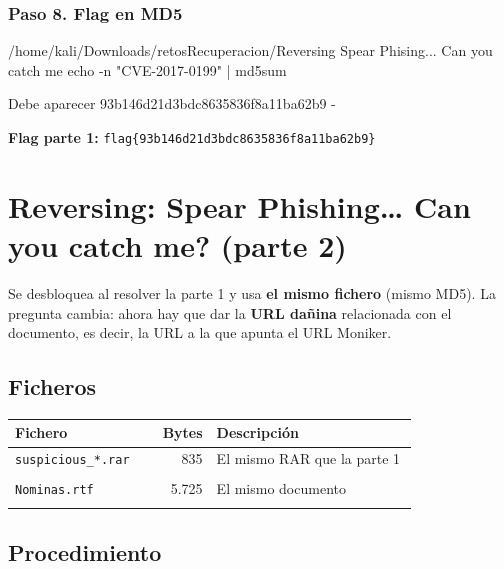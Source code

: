\documentclass[11pt,a4paper]{article}
\begin{document}
\subsubsection*{Paso 8. Flag en MD5}
\begin{comando}{/home/kali/Downloads/retosRecuperacion/Reversing Spear Phising... Can you catch me}
echo -n "CVE-2017-0199" | md5sum
\end{comando}
\begin{salida}{Debe aparecer}
93b146d21d3bdc8635836f8a11ba62b9  -
\end{salida}
\begin{nota}\textbf{Flag parte 1:} \texttt{flag\{93b146d21d3bdc8635836f8a11ba62b9\}}\end{nota}



\section{Reversing: Spear Phishing\dots{} Can you catch me? (parte 2)}
Se desbloquea al resolver la parte 1 y usa \textbf{el mismo fichero} (mismo MD5). La pregunta cambia: ahora hay que
dar la \textbf{URL dañina} relacionada con el documento, es decir, la URL a la que apunta el URL Moniker.
\subsection{Ficheros}
\begin{longtable}{@{}L{0.30\linewidth}r L{0.50\linewidth}@{}}
\toprule \textbf{Fichero} & \textbf{Bytes} & \textbf{Descripción} \\ \midrule \endhead
\texttt{suspicious\_\allowbreak{}*.rar} & 835 & El mismo RAR que la parte 1 \\ \nopagebreak
{} \\ \midrule
\texttt{Nominas.rtf} & 5.725 & El mismo documento \\ \nopagebreak
{} \\ \midrule
\end{longtable}


\subsection{Procedimiento}
\end{document}
